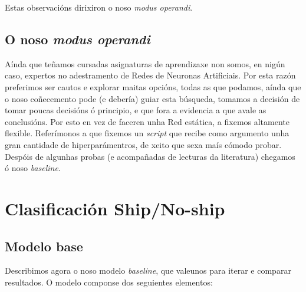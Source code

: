 \documentclass{article}
\begin{document}
Estas observacións dirixiron o noso \emph{modus operandi}.

\subsection{O noso \emph{modus operandi}}

Aínda que teñamos cursadas asignaturas de aprendizaxe non somos, en nigún caso, expertos no adestramento de Redes de Neuronas Artificiais. Por esta razón preferimos ser cautos e explorar maitas opcións, todas as que podamos, aínda que o noso coñecemento pode (e debería) guiar esta búsqueda, tomamos a decisión de tomar poucas decisións ó principio, e que fora a evidencia a que avale as conclusións. Por esto en vez de faceren unha Red estática, a fixemos altamente flexible. Referímonos a que fixemos un \emph{script} que recibe como argumento unha gran cantidade de hiperparámentros, de xeito que sexa maís cómodo probar. Despóis de algunhas probas (e acompañadas de lecturas da literatura) chegamos ó noso \emph{baseline}.

\section{Clasificación Ship/No-ship}
\subsection{Modelo base}

Describimos agora o noso modelo \emph{baseline}, que valeunos para iterar e comparar resultados. O modelo componse dos seguientes elementos:
\end{document}
